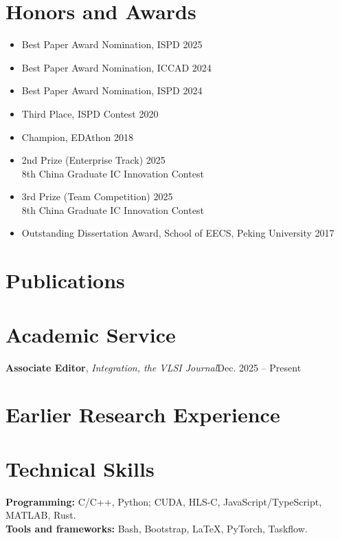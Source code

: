 \documentclass[11pt]{article}
\begin{document}
\section{Honors and Awards}
\begin{itemize}
\item Best Paper Award Nomination, ISPD \hfill 2025
\item Best Paper Award Nomination, ICCAD \hfill 2024
\item Best Paper Award Nomination, ISPD \hfill 2024
\item\vspace{4pt} Third Place, ISPD Contest \hfill 2020
\item Champion, EDAthon \hfill 2018
\item 2nd Prize (Enterprise Track) \hfill 2025\\
{\small 8th China Graduate IC Innovation Contest}
\item 3rd Prize (Team Competition) \hfill 2025\\
{\small 8th China Graduate IC Innovation Contest}
\item\vspace{4pt} Outstanding Dissertation Award, School of EECS, Peking University \hfill 2017
\end{itemize}

\clearpage
\section{Publications}


\section{Academic Service}
\textbf{Associate Editor}, \textit{Integration, the VLSI Journal}\hfill Dec. 2025 -- Present

\section{Earlier Research Experience}
\entrygap
{}
\entrygap
{}

\section{Technical Skills}
\textbf{Programming:} C/C++, Python; CUDA, HLS-C, JavaScript/TypeScript, MATLAB, Rust.\\
\textbf{Tools and frameworks:} Bash, Bootstrap, \LaTeX, PyTorch, Taskflow.
\end{document}
